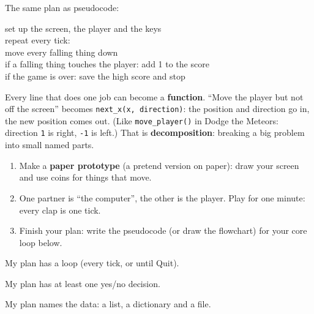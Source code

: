 The same plan as pseudocode:
\begin{tcolorbox}[colback=white,colframe=kcgray,boxrule=0.6pt,arc=2pt,title={\small\bfseries Pseudocode},coltitle=white,colbacktitle=kcgray]
\ttfamily\small
set up the screen, the player and the keys\\
repeat every tick:\\
\hspace*{2em}move every falling thing down\\
\hspace*{2em}if a falling thing touches the player: add 1 to the score\\
\hspace*{2em}if the game is over: save the high score and stop
\end{tcolorbox}
Every line that does one job can become a \textbf{function}. \enquote{Move the player but not off the
screen} becomes \texttt{next\_x(x, direction)}: the position and direction go in, the new position
comes out. (Like \texttt{move\_player()} in Dodge the Meteors: direction \texttt{1} is right, \texttt{-1} is left.) That is \textbf{decomposition}: breaking a big problem into small named parts.

\begin{exercise}
\begin{enumerate}
  \item Make a \textbf{paper prototype} (a pretend version on paper): draw your screen and use coins for things that move.
  \item One partner is \enquote{the computer}, the other is the player. Play for one minute: every clap is one tick.
  \item Finish your plan: write the pseudocode (or draw the flowchart) for your core loop below.
\end{enumerate}
\answerspace{4.5cm}
\begin{checklist}
  \item My plan has a loop (every tick, or until Quit).
  \item My plan has at least one yes/no decision.
  \item My plan names the data: a list, a dictionary and a file.
\end{checklist}
\end{exercise}

